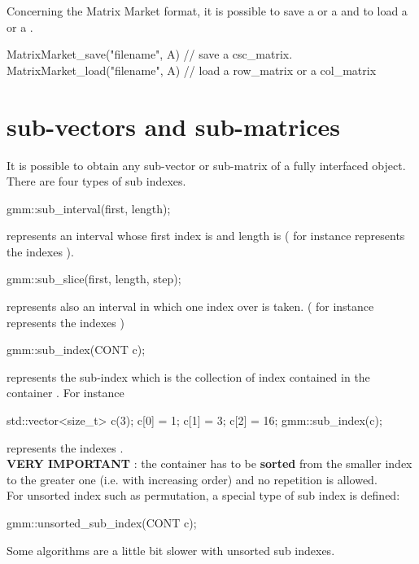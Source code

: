 \documentclass[11pt,a4paper]{article}
\begin{document}
Concerning the Matrix Market format, it is possible to save a  or a   and to load a  or a .
\begin{cppcode}
MatrixMarket_save("filename", A) // save a csc_matrix.
MatrixMarket_load("filename", A) // load a row_matrix or a col_matrix
\end{cppcode}


\section{sub-vectors and sub-matrices}
It is possible to obtain any sub-vector or sub-matrix of a fully interfaced object. There are four types of sub indexes.
\begin{cppcode}
  gmm::sub_interval(first, length);
\end{cppcode}
represents an interval whose first index is  and length is  ( for instance  represents the indexes ).
\begin{cppcode}
  gmm::sub_slice(first, length, step);
\end{cppcode}
represents also an interval in which one index over  is taken. ( for instance  represents the indexes )
\begin{cppcode}
  gmm::sub_index(CONT c);
\end{cppcode}
represents the sub-index which is the collection of index contained in the container . For instance
\begin{cppcode}
  std::vector<size_t> c(3);
  c[0] = 1; c[1] = 3; c[2] = 16;
  gmm::sub_index(c);
\end{cppcode}

represents the indexes .\\
{\bf VERY IMPORTANT} : the container  has to be {\bf sorted} from the smaller index to the greater one (i.e. with increasing order) and no repetition is allowed.\\
For unsorted index such as permutation, a special type of sub index is defined:\\

\begin{cppcode}
  gmm::unsorted_sub_index(CONT c);
\end{cppcode}
Some algorithms are a little bit slower with unsorted sub indexes.
\end{document}
